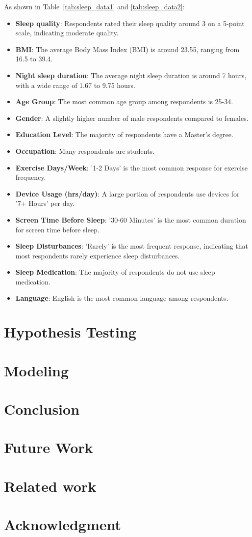 \documentclass[conference]{IEEEtran}
\begin{document}
As shown in Table~\ref{tab:sleep_data1} and \ref{tab:sleep_data2}:
\begin{itemize}
    \item \textbf{Sleep quality}: Respondents rated their sleep quality around 3 on a 5-point scale, indicating moderate quality.
    \item \textbf{BMI}: The average Body Mass Index (BMI) is around 23.55, ranging from 16.5 to 39.4.
    \item \textbf{Night sleep duration}: The average night sleep duration is around 7 hours, with a wide range of 1.67 to 9.75 hours.\item \textbf{Age Group}: The most common age group among respondents is 25-34.
    \item \textbf{Gender}: A slightly higher number of male respondents compared to females.
    \item \textbf{Education Level}: The majority of respondents have a Master's degree.
    \item \textbf{Occupation}: Many respondents are students.
    \item \textbf{Exercise Days/Week}: '1-2 Days' is the most common response for exercise frequency.
    \item \textbf{Device Usage (hrs/day)}: A large portion of respondents use devices for '7+ Hours' per day.
    \item \textbf{Screen Time Before Sleep}: '30-60 Minutes' is the most common duration for screen time before sleep.
    \item \textbf{Sleep Disturbances}: 'Rarely' is the most frequent response, indicating that most respondents rarely experience sleep disturbances.
    \item \textbf{Sleep Medication}: The majority of respondents do not use sleep medication.
    \item \textbf{Language}: English is the most common language among respondents.

\end{itemize}    
\section{Hypothesis Testing}
\section{Modeling}
\section{Conclusion}
\section{Future Work}


\section{Related work}
\section*{Acknowledgment}


\end{document}
